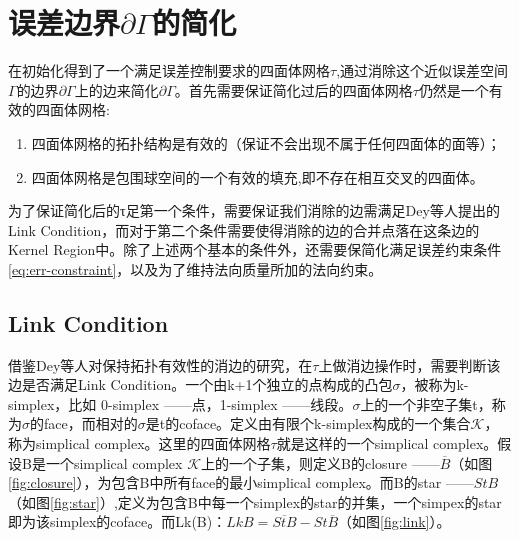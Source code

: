 \section{误差边界$\partial \Gamma$的简化}
在初始化得到了一个满足误差控制要求的四面体网格$\tau$,通过消除这个近似误差空间$\Gamma$的边界$\partial \Gamma$上的边来简化$\partial \Gamma$。首先需要保证简化过后的四面体网格$\tau$仍然是一个有效的四面体网格:
\begin{enumerate}[（1）]
  \item 四面体网格的拓扑结构是有效的（保证不会出现不属于任何四面体的面等）；
  \item 四面体网格是包围球空间的一个有效的填充,即不存在相互交叉的四面体。
\end{enumerate}
为了保证简化后的τ足第一个条件，需要保证我们消除的边需满足Dey等人提出的Link Condition\cite{link-cond}，而对于第二个条件需要使得消除的边的合并点落在这条边的Kernel Region中。除了上述两个基本的条件外，还需要保简化满足误差约束条件\eqref{eq:err-constraint}，以及为了维持法向质量所加的法向约束。

\subsection{Link Condition}
借鉴Dey等人对保持拓扑有效性的消边的研究，在$\tau$上做消边操作时，需要判断该边是否满足Link Condition。一个由k+1个独立的点构成的凸包$\sigma$，被称为k-simplex，比如 0-simplex ——点，1-simplex ——线段。$\sigma$上的一个非空子集t，称为$\sigma$的face，而相对的$\sigma$是t的coface。定义由有限个k-simplex构成的一个集合$\mathcal{K}$，称为simplical complex。这里的四面体网格$\tau$就是这样的一个simplical complex。假设B是一个simplical complex $\mathcal{K}$上的一个子集，则定义B的closure ——$\overline{B}$（如图\ref{fig:closure}），为包含B中所有face的最小simplical complex。而B的star ——$St B$（如图\ref{fig:star}）,定义为包含B中每一个simplex的star的并集，一个simpex的star即为该simplex的coface。而Lk(B)：$Lk B = \overline{St B} - St \overline{B}$（如图\ref{fig:link}）。\par

